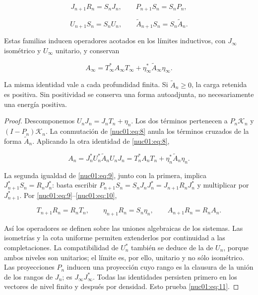 \begin{equation}
J_{n+1}R_n=S_nJ_n,\qquad
P_{n+1}S_n=S_nP_n,
\label{nuc01:eq:9}
\end{equation}

\begin{equation}
U_{n+1}S_n=S_nU_n,\qquad
\widetilde A_{n+1}S_n=S_n\widetilde A_n.
\label{nuc01:eq:10}
\end{equation}

\begin{theorem}
Estas familias inducen operadores acotados en los límites inductivos, con \(J_\infty\) isométrico y \(U_\infty\) unitario, y conservan

\begin{equation}
A_\infty
=T_\infty^*A_\infty T_\infty
 +\eta_\infty^*\widetilde A_\infty\eta_\infty.
\label{nuc01:eq:11}
\end{equation}

La misma identidad vale a cada profundidad finita. Si \(\widetilde A_n\geq0\), la carga retenida es positiva. Sin positividad se conserva una forma autoadjunta, no necesariamente una energía positiva.
\end{theorem}

\begin{proof}
Descomponemos \(U_nJ_n=J_nT_n+\eta_n\). Los dos términos pertenecen a \(P_n\mathscr K_n\) y \((I-P_n)\mathscr K_n\). La conmutación de \eqref{nuc01:eq:8} anula los términos cruzados de la forma \(\widetilde A_n\). Aplicando la otra identidad de \eqref{nuc01:eq:8},

\[
A_n=J_n^*U_n^*\widetilde A_nU_nJ_n
=T_n^*A_nT_n+\eta_n^*\widetilde A_n\eta_n.
\]

La segunda igualdad de \eqref{nuc01:eq:9}, junto con la primera, implica
\(J_{n+1}^*S_n=R_nJ_n^*\): basta escribir
\(P_{n+1}S_n=S_nJ_nJ_n^*=J_{n+1}R_nJ_n^*\) y multiplicar por \(J_{n+1}^*\).
Por \eqref{nuc01:eq:9}–\eqref{nuc01:eq:10},

\[
T_{n+1}R_n=R_nT_n,\qquad
\eta_{n+1}R_n=S_n\eta_n,\qquad
A_{n+1}R_n=R_nA_n.
\]

Así los operadores se definen sobre las uniones algebraicas de los sistemas. Las isometrías y la cota uniforme permiten extenderlos por continuidad a las completaciones. La compatibilidad de \(U_n^*\) también se deduce de la de \(U_n\), porque ambos niveles son unitarios; el límite es, por ello, unitario y no sólo isométrico. Las proyecciones \(P_n\) inducen una proyección cuyo rango es la clausura de la unión de los rangos de \(J_n\); es \(J_\infty J_\infty^*\). Todas las identidades persisten primero en los vectores de nivel finito y después por densidad. Esto prueba \eqref{nuc01:eq:11}.
\end{proof}

